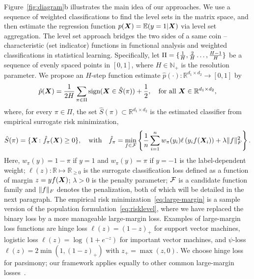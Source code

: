 \documentclass[11pt]{article}
\theoremstyle{definition}
\def\sign{\textup{sign}}
\begin{document}
Figure~\ref{fig:diagram}b illustrates the main idea of our approaches. We use a sequence of weighted classifications to find the level sets in the matrix space, and then estimate the regression function $p(\bm X)=\mathbb{E}(y=1|\bm X)$ via level set aggregation. The level set approach bridges the two sides of a same coin -- characteristic (set indicator) functions in functional analysis and weighted classifications in statistical learning. Specifically, let $\Pi=\{{1\over H},{2\over H} \ldots, {H-1\over H} \}$ be a sequence of evenly spaced points in $[0,1]$, where $H\in\mathbb{N}_{+}$ is the resolution parameter. We propose an $H$-step function estimate $\hat p(\cdot)\colon \mathbb{R}^{d_1\times d_2} \to [0,1]$ by
\begin{equation}\label{eq:stepfunction}
\hat p(\mX)= {1\over 2H}  \sum_{\pi \in \Pi} \sign (\mX\in \hat S(\pi))+{1\over 2},\quad \text{for all }\mX\in\mathbb{R}^{d_1\times d_2},
\end{equation}
where, for every $\pi\in\Pi$, the set $\hat S(\pi)\subset \mathbb{R}^{d_1\times d_2}$ is the estimated classifier from empirical surrogate risk minimization,
\begin{align}\label{eq:large-margin}
\hat S(\pi) = \{\bm X \colon \hat f_\pi(\bm X) \geq 0\}, \quad \text{with}\quad \hat f_\pi=\min_{f\in\mathcal{F}}\left\{ {1\over n}\sum_{i=1}^n w_{\pi}(y_i)\ell\left(y_if(\bm X_i)\right)+ \lambda \lVert f\rVert_F^2\right\}.
\end{align}
Here, $w_\pi(y) = 1-\pi $ if $y = 1$ and $w_\pi(y)=\pi$ if $y = -1$ is the label-dependent weight; $\ell(z)\colon \mathbb{R}\mapsto \mathbb{R}_{\geq 0}$ is the surrogate classification loss defined as a function of margin $z=yf(\bm X)$; $\lambda>0$ is the penalty parameter; $\mathcal{F}$ is a candidate function family and $\lVert f\rVert_F$ denotes the penalization, both of which will be detailed in the next paragraph. The empirical risk minimization~\eqref{eq:large-margin} is a sample version of the population formulation~\eqref{eq:risklevel}, where we have replaced the binary loss by a more manageable large-margin loss. Examples of large-margin loss functions are hinge loss $\ell(z) = (1-z)_+$ for support vector machines, logistic loss $\ell(z) =\log(1+e^{-z})$ for important vector machines, and $\psi$-loss $\ell(z)=2\min(1,(1-z)_+)$ with $z_{+}=\max(z,0)$. We choose hinge loss for parsimony; our framework applies equally to other common large-margin losses~\citep{bartlett2006convexity}. 
\end{document}
